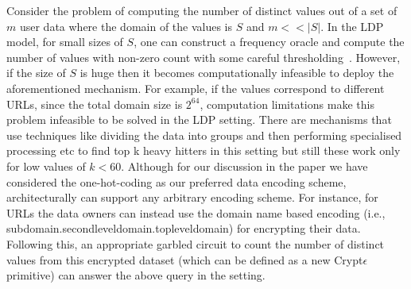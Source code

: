  Consider the problem of computing the number of distinct values out of a set of $m$ user data where the domain of the values is $S$ and $m<<|S|$. In the \textsf{LDP} model, for small sizes of $S$, one can construct a frequency oracle and compute the number of values with non-zero count with some careful thresholding~\cite{LDP1}. However, if the size of $S$ is huge then it becomes computationally infeasible to deploy the aforementioned mechanism. For example, if the values correspond to different URLs, since the total domain size is $2^{64}$, computation limitations make this problem infeasible to be solved in the \textsf{LDP} setting. There are mechanisms that use techniques like dividing the data into groups and then performing specialised processing etc to find top k heavy hitters in this setting \cite{HH,HH2} but still these work only for low values of $k<60$.  Although for our discussion in the paper we have considered the one-hot-coding as our preferred data encoding scheme, \system architecturally can support any arbitrary encoding scheme.  For instance, for URLs the data owners can instead use the domain name based encoding (i.e., subdomain.secondleveldomain.topleveldomain) for encrypting their data. Following this, an appropriate garbled circuit to count the number of distinct values from this encrypted dataset (which can be defined as a new Crypt$\epsilon$ primitive) can answer the above query in the \system setting.

